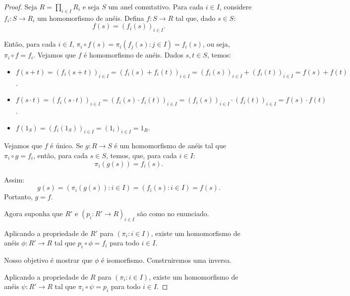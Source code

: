 \begin{proof}
    Seja $R=\prod_{i \in I}R_i$ e seja $S$ um anel comutativo. Para cada $i \in I$, considere $f_i:S\rightarrow R_i$ um homomorfismo de anéis. Defina $f:S\rightarrow R$ tal que, dado $s \in S$:
    $$f(s)=(f_i(s))_{i \in I}.$$

    Então, para cada $i \in I$, $\pi_i\circ f(s)=\pi_i(f_j(s): j \in I)=f_i(s)$, ou seja, $\pi_i\circ f=f_i$.
    Vejamos que $f$ é homomorfismo de anéis. Dados $s, t \in S$, temos:
    \begin{itemize}
        \item $f(s+t)=(f_i(s+t))_{i \in I}=(f_i(s)+f_i(t))_{i \in I}=(f_i(s))_{i \in I}+(f_i(t))_{i \in I}=f(s)+f(t)$.
        \item $f(s\cdot t)=(f_i(s\cdot t))_{i \in I}=(f_i(s)\cdot f_i(t))_{i \in I}=(f_i(s))_{i \in I}\cdot (f_i(t))_{i \in I}=f(s)\cdot f(t)$.
        \item $f(1_S)=(f_i(1_S))_{i \in I}=(1_i)_{i \in I}=1_R$.  
    \end{itemize}
    Vejamos que $f$ é único. Se $g:R\rightarrow S$ é um homomorfismo de anéis tal que $\pi_i\circ g=f_i$, então, para cada $s \in S$, temos, que, para cada $i \in I$:
    $$\pi_i(g(s))=f_i(s).$$

    Assim: $$g(s)=(\pi_i(g(s)): i \in I)=(f_i(s): i \in I)=f(s).$$
    Portanto, $g=f$.

    Agora suponha que $R'$ e $(p_i:R'\rightarrow R)_{i \in I}$ são como no enunciado.

    Aplicando a propriedade de $R'$ para $(\pi_i: i \in I)$, existe um homomorfismo de anéis $\phi: R'\rightarrow R$ tal que $p_i\circ \phi=f_i$ para todo $i \in I$.

    \begin{figure}[H]
        \centering
    \end{figure}

    Nosso objetivo é mostrar que $\phi$ é isomorfismo. Construiremos uma inversa.

    Aplicando a propriedade de $R$ para $(\pi_i: i \in I)$, existe um homomorfismo de anéis $\psi: R'\rightarrow R$ tal que $\pi_i\circ \psi=p_i$ para todo $i \in I$.  


\end{proof}
